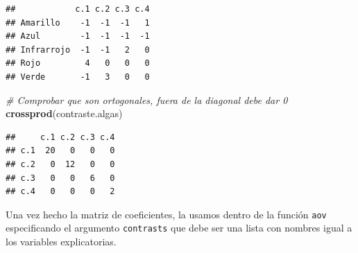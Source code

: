 \documentclass[]{book}
\newenvironment{Shaded}{\begin{snugshade}}{\end{snugshade}}
\newcommand{\CommentTok}[1]{\textcolor[rgb]{0.56,0.35,0.01}{\textit{#1}}}
\newcommand{\DataTypeTok}[1]{\textcolor[rgb]{0.13,0.29,0.53}{#1}}
\newcommand{\DecValTok}[1]{\textcolor[rgb]{0.00,0.00,0.81}{#1}}
\newcommand{\KeywordTok}[1]{\textcolor[rgb]{0.13,0.29,0.53}{\textbf{#1}}}
\newcommand{\NormalTok}[1]{#1}
\newcommand{\OperatorTok}[1]{\textcolor[rgb]{0.81,0.36,0.00}{\textbf{#1}}}
\newcommand{\StringTok}[1]{\textcolor[rgb]{0.31,0.60,0.02}{#1}}
\theoremstyle{definition}
\theoremstyle{definition}
\theoremstyle{definition}
\theoremstyle{remark}
\begin{document}
\begin{Shaded}
\end{Shaded}

\begin{verbatim}
##            c.1 c.2 c.3 c.4
## Amarillo    -1  -1  -1   1
## Azul        -1  -1  -1  -1
## Infrarrojo  -1  -1   2   0
## Rojo         4   0   0   0
## Verde       -1   3   0   0
\end{verbatim}

\begin{Shaded}
\begin{Highlighting}[]
\CommentTok{# Comprobar que son ortogonales, fuera de la diagonal debe dar 0}
\KeywordTok{crossprod}\NormalTok{(contraste.algas)}
\end{Highlighting}
\end{Shaded}

\begin{verbatim}
##     c.1 c.2 c.3 c.4
## c.1  20   0   0   0
## c.2   0  12   0   0
## c.3   0   0   6   0
## c.4   0   0   0   2
\end{verbatim}

Una vez hecho la matriz de coeficientes, la usamos dentro de la función
\texttt{aov} especificando el argumento \texttt{contrasts} que debe ser
una lista con nombres igual a los variables explicatorias.
\end{document}
